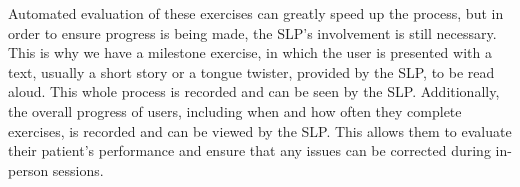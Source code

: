 Automated evaluation of these exercises can greatly speed up the process, but in order to ensure progress is being made, the SLP's involvement is still necessary. This is why we have a milestone exercise, in which the user is presented with a text, usually a short story or a tongue twister, provided by the SLP, to be read aloud. This whole process is recorded and can be seen by the SLP. Additionally, the overall progress of users, including when and how often they complete exercises, is recorded and can be viewed by the SLP. This allows them to evaluate their patient's performance and ensure that any issues can be corrected during in-person sessions.
